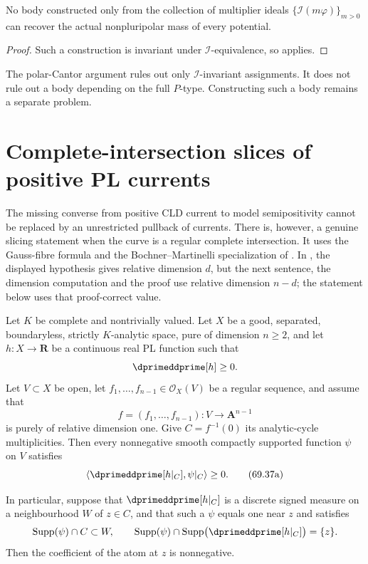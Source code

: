 \begin{corollary}\label{cor:verified-ideals-insufficient}
No body constructed only from the collection of multiplier ideals
$\{\mathcal I(m\varphi)\}_{m>0}$ can recover the actual
nonpluripolar mass of every potential.
\end{corollary}

\begin{proof}
Such a construction is invariant under
$\mathcal I$-equivalence, so
 applies.
\end{proof}

\begin{remark}
\label{rem:verified-p-sensitive-body}
The polar-Cantor argument rules out only
$\mathcal I$-invariant assignments. It does not rule out a body
depending on the full $P$-type. Constructing such a body remains a
separate problem.
\end{remark}

\section{Complete-intersection slices of positive PL currents}
\label{sec:verified-lci-current-slice}

The missing converse from positive CLD current to model semipositivity
cannot be replaced by an unrestricted pullback of currents.  There is,
however, a genuine slicing statement when the curve is a regular complete
intersection.  It uses the Gauss-fibre formula and the
Bochner--Martinelli specialization of \cite[\S\S18.6--18.7]{CLD25}.  In
\cite[Proposition~18.7.3]{CLD25}, the displayed hypothesis gives relative
dimension $d$, but the next sentence, the dimension computation and the
proof use relative dimension $n-d$; the statement below uses that
proof-correct value.

\begin{proposition}
\label{prop:verified-lci-current-slice}
Let \(K\) be complete and nontrivially valued.  Let \(X\) be a good,
separated, boundaryless, strictly \(K\)-analytic space, pure of dimension
\(n\geq2\), and let \(h:X\to\mathbf R\) be a continuous real PL function
such that
\[
                            \dprimeddprime[h]\geq0.
\]
Let \(V\subset X\) be open, let
\(f_1,\ldots,f_{n-1}\in\mathcal O_X(V)\) be a regular sequence, and assume
that
\[
 f=(f_1,\ldots,f_{n-1}):V\longrightarrow\mathbf A^{n-1}
\]
is purely of relative dimension one.  Give
\(C=f^{-1}(0)\) its analytic-cycle multiplicities.  Then every nonnegative
smooth compactly supported function \(\psi\) on \(V\) satisfies
\[
 \left\langle\dprimeddprime[h|_C],\psi|_C\right\rangle\geq0.
\tag{69.37a}\label{eq:verified-lci-slice-positive}
\]

In particular, suppose that \(\dprimeddprime[h|_C]\) is a discrete signed
measure on a neighbourhood \(W\) of \(z\in C\), and that such a \(\psi\)
equals one near \(z\) and satisfies
\[
 \operatorname{Supp}(\psi)\cap C\subset W,\qquad
 \operatorname{Supp}(\psi)\cap
 \operatorname{Supp}\bigl(\dprimeddprime[h|_C]\bigr)=\{z\}.
\]
Then the coefficient of the atom at \(z\) is nonnegative.
\end{proposition}

